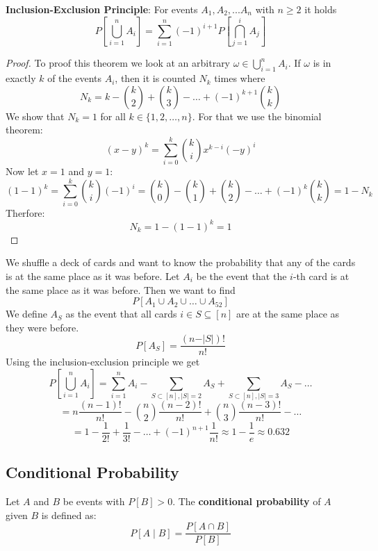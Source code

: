 \begin{theorem}
    \textbf{Inclusion-Exclusion Principle}: For events $A_1, A_2, ... A_n$ with $n \geq 2$ it holds
    $$P[\bigcup_{i=1}^n A_i] = \sum_{i=1}^n (-1)^{i+1} P[\bigcap_{j=1}^i A_j]$$
\end{theorem}

\begin{proof}
    To proof this theorem we look at an arbitrary $\omega \in \bigcup_{i=1}^n A_i$. If $\omega$ is in exactly
    $k$ of the events $A_i$, then it is counted $N_k$ times where
    $$N_k = k - \binom{k}{2} + \binom{k}{3} - \dots + (-1)^{k+1} \binom{k}{k}$$
    We show that $N_k = 1$ for all $k \in \{1, 2, \dots, n\}$. For that we use the binomial theorem:
    $$(x-y)^k = \sum_{i=0}^k \binom{k}{i} x^{k-i} (-y)^i$$
    Now let $x=1$ and $y=1$:
    $$(1-1)^k = \sum_{i=0}^k \binom{k}{i} (-1)^i = \binom{k}{0} - \binom{k}{1} + \binom{k}{2} - \dots + (-1)^k
    \binom{k}{k} = 1- N_k$$
    Therfore:
    $$N_k = 1 - (1-1)^k = 1$$
\end{proof}

\begin{example}
    We shuffle a deck of cards and want to know the probability that any of the cards is at the same place as it was before.
    Let $A_i$ be the event that the $i$-th card is at the same place as it was before. Then we want to find
    $$P[A_1 \cup A_2 \cup \dots \cup A_{52}]$$
    We define $A_S$ as the event that all cards $i \in S \subseteq[n]$ are at the same place as they were before.
    $$P[A_S] = \frac{(n - \vert S \vert)!}{n!}$$
    Using the inclusion-exclusion principle we get
    $$P[\bigcup_{i=1}^n A_i] = \sum_{i=1}^n A_i - \sum_{S \subset [n], \vert S \vert = 2} A_S + \sum_{S \subset [n], \vert S \vert = 3} A_S - \dots$$
    $$= n \frac{(n-1)!}{n!} - \binom{n}{2} \frac{(n-2)!}{n!} + \binom{n}{3} \frac{(n-3)!}{n!} - \dots$$
    $$= 1 - \frac{1}{2!} + \frac{1}{3!} - \dots + (-1)^{n+1} \frac{1}{n!} \approx 1 - \frac{1}{e} \approx 0.632$$
\end{example}

\subsection{Conditional Probability}

\begin{definition}
    Let $A$ and $B$ be events with $P[B] > 0$. The \textbf{conditional probability} of $A$ given $B$ is defined as:
    $$P[A \mid B] = \frac{P[A \cap B]}{P[B]}$$
\end{definition}

